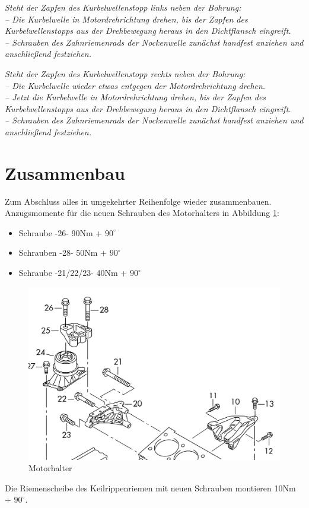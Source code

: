 \documentclass[twoside,a4paper]{refart}
\begin{document}
\textit{Steht der Zapfen des Kurbelwellenstopp links neben
der Bohrung:\\
– Die Kurbelwelle in Motordrehrichtung drehen, bis der Zapfen
des Kurbelwellenstopps aus der Drehbewegung heraus in den
Dichtflansch eingreift.\\
– Schrauben des Zahnriemenrads der Nockenwelle zunächst
handfest anziehen und anschließend festziehen.\\}


\textit{Steht der Zapfen des Kurbelwellenstopp rechts neben
der Bohrung:\\
– Die Kurbelwelle wieder etwas entgegen der Motordrehrichtung
drehen.\\
– Jetzt die Kurbelwelle in Motordrehrichtung drehen, bis der
Zapfen des Kurbelwellenstopps aus der Drehbewegung heraus
in den Dichtflansch eingreift.\\
– Schrauben des Zahnriemenrads der Nockenwelle zunächst
handfest anziehen und anschließend festziehen.}

\section{Zusammenbau}
Zum Abschluss alles in umgekehrter Reihenfolge wieder zusammenbauen.
Anzugsmomente für die neuen Schrauben des Motorhalters in Abbildung \ref{fig:motorhalterschrauben}:
\begin{itemize}
	\item Schraube -26- 90Nm + $90^\circ$
	\item Schrauben -28- 50Nm + $90^\circ$
	\item Schraube -21/22/23- 40Nm + $90^\circ$
\end{itemize}
\begin{figure}[htb]
	\begin{center}
		\includegraphics[width=\textwidth]{Motorhalter}
		\caption{Motorhalter}
		\label{fig:motorhalterschrauben}
	\end{center}
\end{figure}
Die Riemenscheibe des Keilrippenriemen mit neuen Schrauben montieren 10Nm + $90^\circ$.
\end{document}
